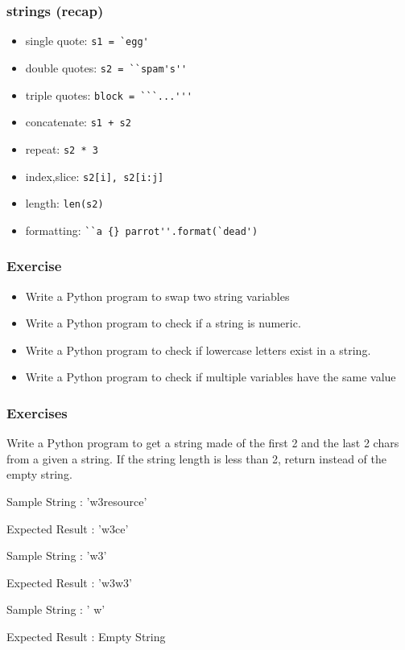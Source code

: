 \begin{frame}[fragile]\frametitle{strings (recap)}
  \begin{itemize}
  \item single quote: \lstinline{s1 = `egg'}
\item double quotes: \lstinline{s2 = ``spam's''}
\item triple quotes: \lstinline{block = ```...'''}
\item concatenate: \lstinline{s1 + s2}
\item repeat: \lstinline{s2 * 3}
\item index,slice: \lstinline{s2[i], s2[i:j]}
\item length: \lstinline{len(s2)}
\item formatting: \lstinline|``a {} parrot''.format(`dead')|
  \end{itemize}
\end{frame}


\begin{frame}[fragile]\frametitle{Exercise}
\begin{itemize}
\item Write a Python program to swap two string variables
\item Write a Python program to check if a string is numeric.
\item Write a Python program to check if lowercase letters exist in a string.
\item Write a Python program to check if multiple variables have the same value
\end{itemize}
\end{frame}

\begin{frame}[fragile]\frametitle{Exercises}
Write a Python program to get a string made of the first 2 and the last 2 chars from a given a string. If the string length is less than 2, return instead of the empty string. 

Sample String : 'w3resource'

Expected Result : 'w3ce'

Sample String : 'w3'

Expected Result : 'w3w3'

Sample String : ' w'

Expected Result : Empty String 
\end{frame}

